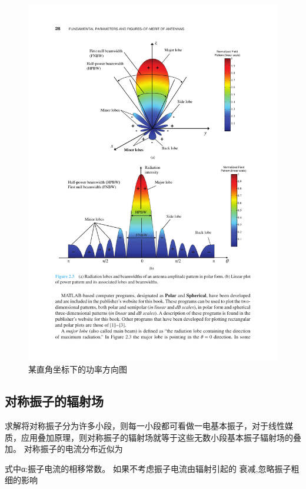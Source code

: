         \begin{figure}[htp]
            \centering
            \includegraphics[width=14cm]{figure/5-2.pdf}
            \caption{\kaishu 某直角坐标下的功率方向图}\label{Fig: 天线方向图图例}
        \end{figure}

    \subsection{对称振子的辐射场}
        求解将对称振子分为许多小段，则每一小段都可看做一电基本振子，对于线性媒质，应用叠加原理，则对称振子的辐射场就等于这些无数小段基本振子辐射场的叠加。
        对称振子的电流分布近似为

        式中α:振子电流的相移常数。
        如果不考虑振子电流由辐射引起的
        衰减,忽略振子粗细的影响

